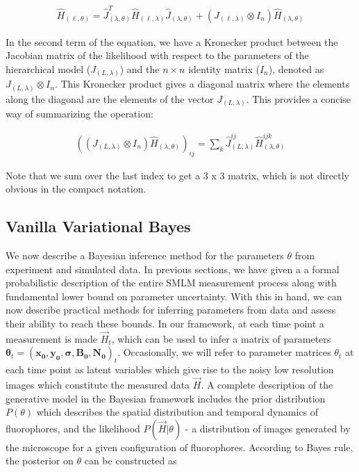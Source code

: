 \documentclass{ucetd}
\begin{document}
\begin{align*}
\hat{H}_{(\ell,\theta)} = \hat{J}_{(\lambda,\theta)}^{T} \hat{H}_{(\ell,\lambda)} \hat{J}_{(\lambda,\theta)} + (J_{(\ell,\lambda)}\otimes I_{n})\hat{H}_{(\lambda,\theta)}
\end{align*}

In the second term of the equation, we have a Kronecker product between the Jacobian matrix of the likelihood with respect to the parameters of the hierarchical model ($J_{(L,\lambda)}$) and the $n\times n$ identity matrix ($I_n$), denoted as $J_{(L,\lambda)}\otimes I_n$. This Kronecker product gives a diagonal matrix where the elements along the diagonal are the elements of the vector $J_{(L,\lambda)}$. This provides a concise way of summarizing the operation:

\begin{align*}
((J_{(L,\lambda)}\otimes I_{n})\hat{H}_{(\lambda,\theta)})_{ij} = \sum_{k}\hat{J}_{(L,\lambda)}^{ij}\hat{H}_{(\lambda,\theta)}^{ijk}
\end{align*}

Note that we sum over the last index to get a 3 x 3 matrix, which is not directly obvious in the compact notation.


\subsection{Vanilla Variational Bayes}

We now describe a Bayesian inference method for the parameters $\theta$ from experiment and simulated data. In previous sections, we have given a a formal probabilistic description of the entire SMLM measurement process along with fundamental lower bound on parameter uncertainty. With this in hand, we can now describe practical methods for inferring parameters from data and assess their ability to reach these bounds.  In our framework, at each time point a measurement is made $\vec{H}_{t}$, which can be used to infer a matrix of parameters $\bm{\theta}_{t} = (\bm{x_{0}},\bm{y_{0}},\bm{\sigma},\bm{B_{0}},\bm{N_{0}})_{t}$. Occasionally, we will refer to parameter matrices $\theta_{t}$ at each time point as latent variables which give rise to the noisy low resolution images which constitute the measured data $\vec{H}$. A complete description of the generative model in the Bayesian framework includes the prior distribution $P(\theta)$ which describes the spatial distribution and temporal dynamics of fluorophores, and the likelihood $P(\vec{H}|\theta)$ - a distribution of images generated by the microscope for a given configuration of fluorophores. According to Bayes rule, the posterior on $\theta$ can be constructed as
\end{document}
